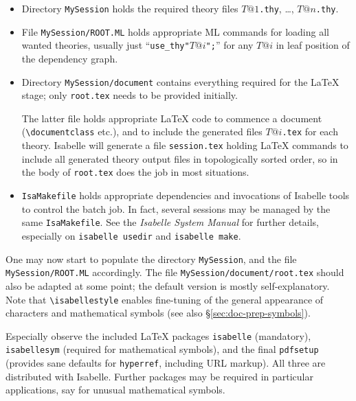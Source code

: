 \begin{isabellebody}
\begin{isamarkuptext}
  \begin{itemize}

  \item Directory \texttt{MySession} holds the required theory files
  $T@1$\texttt{.thy}, \dots, $T@n$\texttt{.thy}.

  \item File \texttt{MySession/ROOT.ML} holds appropriate ML commands
  for loading all wanted theories, usually just
  ``\texttt{use_thy"$T@i$";}'' for any $T@i$ in leaf position of the
  dependency graph.

  \item Directory \texttt{MySession/document} contains everything
  required for the {\LaTeX} stage; only \texttt{root.tex} needs to be
  provided initially.

  The latter file holds appropriate {\LaTeX} code to commence a
  document (\verb,\documentclass, etc.), and to include the generated
  files $T@i$\texttt{.tex} for each theory.  Isabelle will generate a
  file \texttt{session.tex} holding {\LaTeX} commands to include all
  generated theory output files in topologically sorted order, so
  \verb,, in the body of \texttt{root.tex} does the job
  in most situations.

  \item \texttt{IsaMakefile} holds appropriate dependencies and
  invocations of Isabelle tools to control the batch job.  In fact,
  several sessions may be managed by the same \texttt{IsaMakefile}.
  See the \emph{Isabelle System Manual} \cite{isabelle-sys} 
  for further details, especially on
  \texttt{isabelle usedir} and \texttt{isabelle make}.

  \end{itemize}

  One may now start to populate the directory \texttt{MySession}, and
  the file \texttt{MySession/ROOT.ML} accordingly.  The file
  \texttt{MySession/document/root.tex} should also be adapted at some
  point; the default version is mostly self-explanatory.  Note that
  \verb,\isabellestyle, enables fine-tuning of the general appearance
  of characters and mathematical symbols (see also
  \S\ref{sec:doc-prep-symbols}).

  Especially observe the included {\LaTeX} packages \texttt{isabelle}
  (mandatory), \texttt{isabellesym} (required for mathematical
  symbols), and the final \texttt{pdfsetup} (provides sane defaults
  for \texttt{hyperref}, including URL markup).  All three are
  distributed with Isabelle. Further packages may be required in
  particular applications, say for unusual mathematical symbols.


\end{isamarkuptext}
\end{isabellebody}
